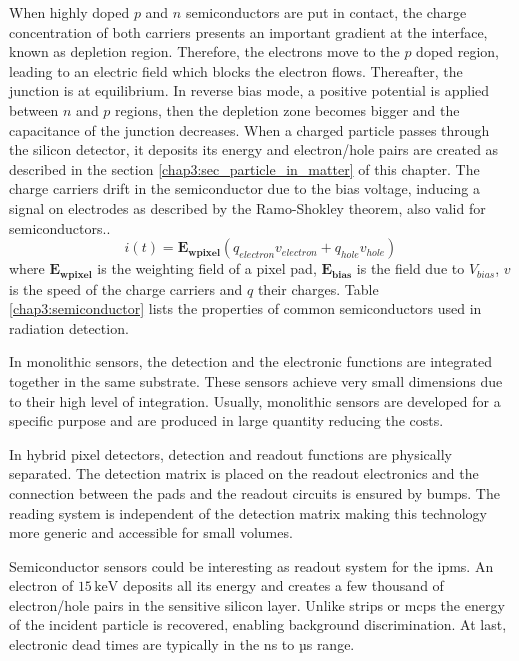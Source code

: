\begin{refsection}
  
  When highly doped $p$ and $n$ semiconductors are put in contact, the charge concentration of both carriers presents an important gradient at the interface, known as depletion region. Therefore, the electrons move to the $p$ doped region, leading to an electric field which blocks the electron flows. Thereafter, the junction is at equilibrium. In reverse bias mode, a positive potential is applied between $n$ and $p$ regions, then the depletion zone becomes bigger and the capacitance of the junction decreases. When a charged particle passes through the silicon detector, it deposits its energy and electron/hole pairs are created as described in the section \ref{chap3:sec_particle_in_matter} of this chapter. The charge carriers drift in the semiconductor due to the bias voltage, inducing a signal on electrodes as described by the Ramo-Shokley theorem, also valid for semiconductors.\cite{Cavalleri1971}.
  \begin{equation}
    i(t) =  \boldsymbol{E_{wpixel}} \left( q_{electron} v_{electron}  + q_{hole} v_{hole} \right)
  \end{equation}
  where $\boldsymbol{E_{wpixel}}$ is the weighting field of a pixel pad, $\boldsymbol{E_{bias}}$ is the field due to $V_{bias}$, $v$ is the speed of the charge carriers and $q$ their charges. Table \ref{chap3:semiconductor} lists the properties of common semiconductors used in radiation detection.
  

  In monolithic sensors, the detection and the electronic functions are integrated together in the same substrate. These sensors achieve very small dimensions due to their high level of integration. Usually, monolithic sensors are developed for a specific purpose and are produced in large quantity reducing the costs.

  In hybrid pixel detectors, detection and readout functions are physically separated. The detection matrix is placed on the readout electronics and the connection between the pads and the readout circuits is ensured by bumps. The reading system is independent of the detection matrix making this technology more generic and accessible for small volumes.

  Semiconductor sensors could be interesting as readout system for the \acrshort{ipm}s. An electron of $15\,\mathrm{keV}$ deposits all its energy and creates a few thousand of electron/hole pairs in the sensitive silicon layer. Unlike strips or \acrshort{mcp}s the energy of the incident particle is recovered, enabling background discrimination. At last, electronic dead times are typically in the ns to µs range.


\end{refsection}
